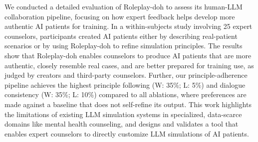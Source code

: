 \documentclass[11pt]{article}
\newcommand{\raj}[1]{\ifthenelse{\boolean{showcomments}}{\textcolor{purple}{[#1 —raj]}}{}}
\begin{document}
We conducted a detailed evaluation of Roleplay-doh to assess its human-LLM collaboration pipeline, focusing on how expert feedback helps develop more authentic AI patients for training. 
In a within-subjects study involving 25 expert counselors, participants created AI patients either by describing real-patient scenarios or by using Roleplay-doh to refine simulation principles. 
The results show that Roleplay-doh enables counselors to produce AI patients that are more authentic, closely resemble real cases, and are better prepared for training use, as judged by creators and third-party counselors.
Further, our principle-adherence pipeline achieves the highest principle following (W: 35\%; L: 5\%) and dialogue consistency (W: 35\%; L: 10\%) compared to all ablations, where preferences are made against a baseline that does not self-refine its output. 
This work highlights the limitations of existing LLM simulation systems in specialized, data-scarce domains like mental health counseling, and designs and validates a tool that enables expert counselors to directly customize LLM simulations of AI patients.
\end{document}
